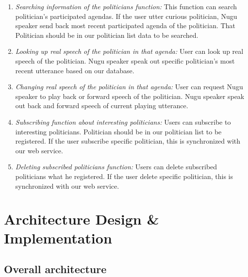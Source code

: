 \documentclass[conference]{IEEEtran}
\begin{document}
\begin{enumerate}
\begin{enumerate}
        \item \textit{Searching information of the politicians function:} This function can search politician’s participated agendas. If the user utter curious politician, Nugu speaker send back most recent participated agenda of the politician. That Politician should be in our politician list data to be searched.\\
        \item \textit{Looking up real speech of the politician in that agenda:} User can look up real speech of the politician. Nugu speaker speak out specific politician’s most recent utterance based on our database.\\
        \item \textit{Changing real speech of the politician in that agenda:} User can request Nugu speaker to play back or forward speech of the politician. Nugu speaker speak out back and forward speech of current playing utterance.\\
        \item \textit {Subscribing function about interesting politicians:} Users can subscribe to interesting politicians.  Politician should be in our politician list to be registered. If the user subscribe specific politician, this is synchronized with our web service.\\
        \item \textit {Deleting subscribed politicians function:} Users can delete subscribed politicians what he registered. If the user delete specific politician, this is synchronized with our web service.\\
           \end{enumerate}
\end{enumerate}
   
\section{Architecture Design \& Implementation}
\subsection{Overall architecture}
\end{document}
